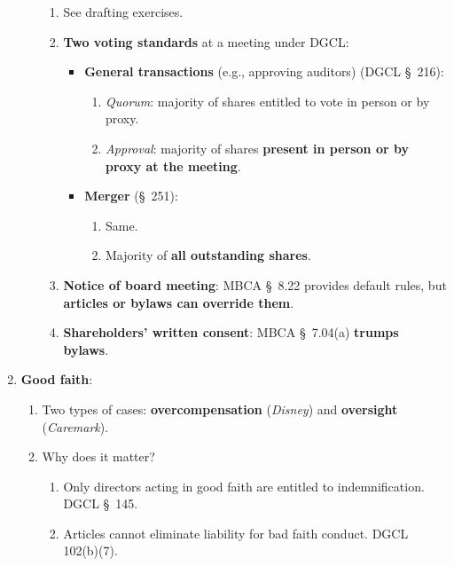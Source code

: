 \begin{enumerate}
\begin{enumerate}
\begin{enumerate}
            \item See drafting exercises.
            \item \textbf{Two voting standards} at a meeting under DGCL:
            \begin{itemize}
                \item \textbf{General transactions} (e.g., approving 
                auditors) (DGCL \S\ 216):
                \begin{enumerate}
                    \item \emph{Quorum}: majority of shares entitled to vote 
                    in person or by proxy.
                    \item \emph{Approval}: majority of shares \textbf{present 
                    in person or by proxy at the meeting}.
                \end{enumerate}
                \item \textbf{Merger} (\S\ 251):
                \begin{enumerate}
                    \item Same.
                    \item Majority of \textbf{all outstanding shares}.
                \end{enumerate}
            \end{itemize}
            \item \textbf{Notice of board meeting}: MBCA \S\ 8.22 provides 
            default rules, but \textbf{articles or bylaws can override them}.
            \item \textbf{Shareholders' written consent}: MBCA \S\ 7.04(a) 
            \textbf{trumps bylaws}.
        \end{enumerate}
    \end{enumerate}
    \item \textbf{Good faith}:
    \begin{enumerate}
        \item Two types of cases: \textbf{overcompensation} (\emph{Disney}) 
        and \textbf{oversight} (\emph{Caremark}).
        \item Why does it matter?
        \begin{enumerate}
            \item Only directors acting in good faith are entitled to 
            indemnification. DGCL \S\ 145.
            \item Articles cannot eliminate liability for bad faith conduct. 
            DGCL 102(b)(7).
        \end{enumerate}

\end{enumerate}
\end{enumerate}
